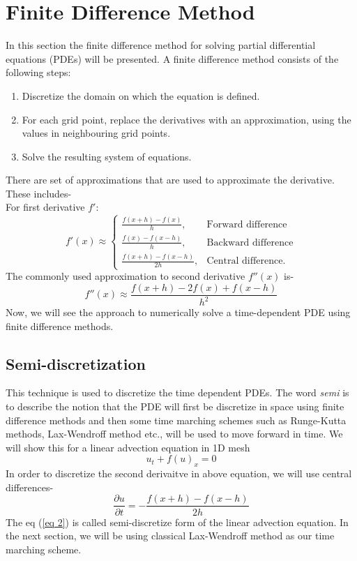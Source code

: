 \section{Finite Difference Method} \label{fdm}
In this section the finite difference method for solving partial differential equations (PDEs) will be presented. A finite difference method consists of the following steps:
\begin{enumerate}
    \item Discretize the domain on which the equation is defined.
    \item For each grid point, replace the derivatives with an approximation, using the values in neighbouring grid points.
    \item Solve the resulting system of equations.
\end{enumerate}
There are set of approximations that are used to approximate the derivative. These includes-\\
For first derivative $f'$:
\begin{equation} \label{eqfdm}
f'(x)\approx 
\begin{cases}
    \frac{f(x+h) - f(x)}{h}, & \text{Forward difference }\\
    \frac{f(x) - f(x-h)}{h}, & \text{Backward difference} \\
    \frac{f(x+h) - f(x-h)}{2h}, & \text{Central difference.}
\end{cases}
\end{equation}
The commonly used approximation to second derivative $f''(x)$ is-
\begin{equation} \label{eqdouble}
    f''(x) \approx \frac{f(x+h) - 2f(x) + f(x-h)}{h^2}
\end{equation}
Now, we will see the approach to numerically solve a time-dependent PDE using finite difference methods.
\subsection{Semi-discretization}
This technique is used to discretize the time dependent PDEs. The word {\em semi} is to describe the notion that the PDE will first be discretize in space using finite difference methods and then some time marching schemes such as Runge-Kutta methods, Lax-Wendroff method etc., will be used to move forward in time. We will show this for a linear advection equation in 1D mesh
\begin{equation} \label{1}
    u_t + f(u)_x = 0
\end{equation}
In order to discretize the second derivaitve in above equation, we will use central differences-
\begin{equation} \label{eq 2}
    \frac{\partial u}{\partial t} = -\frac{f(x+h) - f(x-h)}{2h}
\end{equation}
The eq (\ref{eq 2}) is called semi-discretize form of the linear advection equation. In the next section, we will be using classical Lax-Wendroff method as our time marching scheme.

